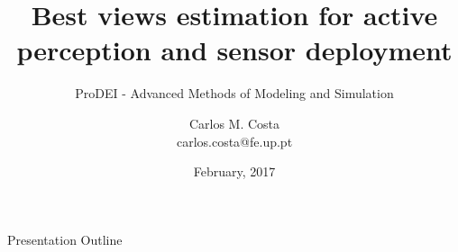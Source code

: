 





\title{Best views estimation for active perception and sensor deployment}
\subtitle{ProDEI - Advanced Methods of Modeling and Simulation}
\author{Carlos M. Costa\texorpdfstring{\\{\ttfamily carlos.costa@fe.up.pt}}{}}
\date{February, 2017}




\begin{frame}
	\titlepage
\end{frame}




\begin{frame}{Presentation Outline}
	\begingroup
	\scriptsize
	\tableofcontents
	\endgroup
\end{frame}













